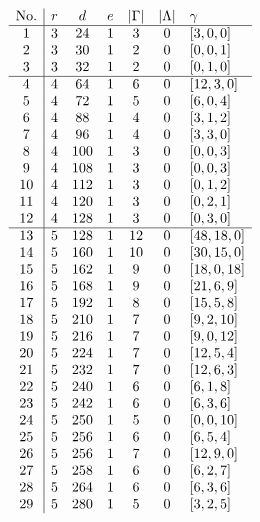 \begingroup
\small
\setlength{\arraycolsep}{5pt}
\renewcommand{\arraystretch}{1.3}
\noindent
\begin{minipage}[t]{0.49\textwidth}
\centering
$\begin{array}[t]{c|ccccc l}
\textrm{No.} & r & d& e & |\Gamma| & |\Lambda| & \gamma \\
\hline
1 & 3 & 24 & 1 & 3 & 0 & [3, 0, 0] \\
2 & 3 & 30 & 1 & 2 & 0 & [0, 0, 1] \\
3 & 3 & 32 & 1 & 2 & 0 & [0, 1, 0] \\
\hline
4 & 4 & 64 & 1 & 6 & 0 & [12, 3, 0] \\
5 & 4 & 72 & 1 & 5 & 0 & [6, 0, 4] \\
6 & 4 & 88 & 1 & 4 & 0 & [3, 1, 2] \\
7 & 4 & 96 & 1 & 4 & 0 & [3, 3, 0] \\
8 & 4 & 100 & 1 & 3 & 0 & [0, 0, 3] \\
9 & 4 & 108 & 1 & 3 & 0 & [0, 0, 3] \\
10 & 4 & 112 & 1 & 3 & 0 & [0, 1, 2] \\
11 & 4 & 120 & 1 & 3 & 0 & [0, 2, 1] \\
12 & 4 & 128 & 1 & 3 & 0 & [0, 3, 0] \\
\hline
13 & 5 & 128 & 1 & 12 & 0 & [48, 18, 0] \\
14 & 5 & 160 & 1 & 10 & 0 & [30, 15, 0] \\
15 & 5 & 162 & 1 & 9 & 0 & [18, 0, 18] \\
16 & 5 & 168 & 1 & 9 & 0 & [21, 6, 9] \\
17 & 5 & 192 & 1 & 8 & 0 & [15, 5, 8] \\
18 & 5 & 210 & 1 & 7 & 0 & [9, 2, 10] \\
19 & 5 & 216 & 1 & 7 & 0 & [9, 0, 12] \\
20 & 5 & 224 & 1 & 7 & 0 & [12, 5, 4] \\
21 & 5 & 232 & 1 & 7 & 0 & [12, 6, 3] \\
22 & 5 & 240 & 1 & 6 & 0 & [6, 1, 8] \\
23 & 5 & 242 & 1 & 6 & 0 & [6, 3, 6] \\
24 & 5 & 250 & 1 & 5 & 0 & [0, 0, 10] \\
25 & 5 & 256 & 1 & 6 & 0 & [6, 5, 4] \\
26 & 5 & 256 & 1 & 7 & 0 & [12, 9, 0] \\
27 & 5 & 258 & 1 & 6 & 0 & [6, 2, 7] \\
28 & 5 & 264 & 1 & 6 & 0 & [6, 3, 6] \\
29 & 5 & 280 & 1 & 5 & 0 & [3, 2, 5] \\
\end{array}$
\end{minipage}
